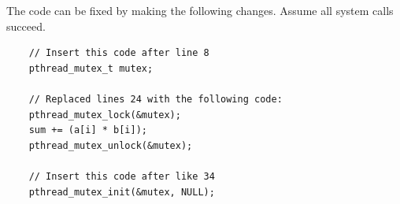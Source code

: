 \documentclass[11pt,largemargins]{homework}
\begin{document}
    The code can be fixed by making the following changes. Assume all system
    calls succeed.
\begin{verbatim}
    // Insert this code after line 8
    pthread_mutex_t mutex;

    // Replaced lines 24 with the following code:
    pthread_mutex_lock(&mutex);
    sum += (a[i] * b[i]);
    pthread_mutex_unlock(&mutex);

    // Insert this code after like 34
    pthread_mutex_init(&mutex, NULL);
\end{verbatim}
\end{document}
